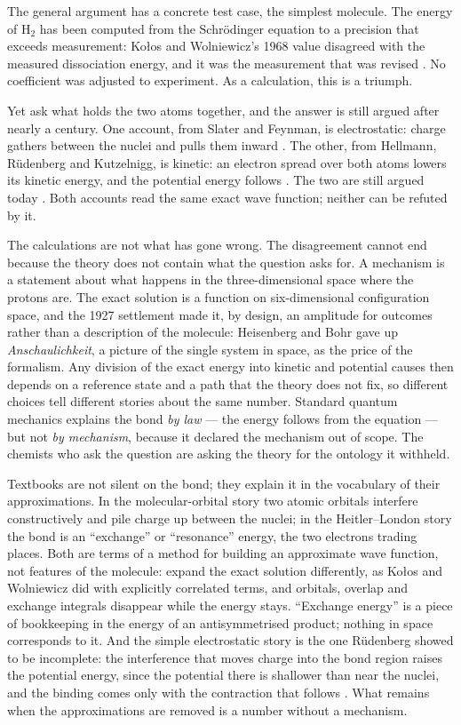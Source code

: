 The general argument has a concrete test case, the simplest molecule. The energy of H$_2$ has been computed
from the Schr\"odinger equation to a precision that exceeds measurement: Ko\l{}os and Wolniewicz's 1968
value disagreed with the measured dissociation energy, and it was the measurement that was revised
\cite{Kolos1968, Herzberg70}. No coefficient was adjusted to experiment. As a calculation, this is a triumph.

Yet ask what holds the two atoms together, and the answer is still argued after nearly a century. One
account, from Slater and Feynman, is electrostatic: charge gathers between the nuclei and pulls them
inward \cite{Slater33, Feynman39}. The other, from Hellmann, R\"udenberg and Kutzelnigg, is kinetic: an
electron spread over both atoms lowers its kinetic energy, and the potential energy follows
\cite{Hellmann33, Ruedenberg62, Kutzelnigg90}. The two are still argued today \cite{Bacskay13}. Both
accounts read the same exact wave function; neither can be refuted by it.

The calculations are not what has gone wrong. The disagreement cannot end because the theory does not
contain what the question asks for. A mechanism is a statement about what happens in the three-dimensional
space where the protons are. The exact solution is a function on six-dimensional configuration space, and
the 1927 settlement made it, by design, an amplitude for outcomes rather than a description of the
molecule: Heisenberg and Bohr gave up \emph{Anschaulichkeit}, a picture of the single system in space, as
the price of the formalism. Any division of the exact energy into kinetic and potential causes then
depends on a reference state and a path that the theory does not fix, so different choices tell different
stories about the same number. Standard quantum mechanics explains the bond \emph{by law} --- the energy
follows from the equation --- but not \emph{by mechanism}, because it declared the mechanism out of
scope. The chemists who ask the question are asking the theory for the ontology it withheld.

Textbooks are not silent on the bond; they explain it in the vocabulary of their approximations. In the
molecular-orbital story two atomic orbitals interfere constructively and pile charge up between the nuclei;
in the Heitler--London story the bond is an ``exchange'' or ``resonance'' energy, the two electrons trading
places. Both are terms of a method for building an approximate wave function, not features of the
molecule: expand the exact solution differently, as Ko\l{}os and Wolniewicz did with explicitly correlated
terms, and orbitals, overlap and exchange integrals disappear while the energy stays. ``Exchange energy''
is a piece of bookkeeping in the energy of an antisymmetrised product; nothing in space corresponds to
it. And the simple electrostatic story is the one R\"udenberg showed to be incomplete: the interference
that moves charge into the bond region raises the potential energy, since the potential there is
shallower than near the nuclei, and the binding comes only with the contraction that follows
\cite{Ruedenberg62}. What remains when the approximations are removed is a number without a mechanism.

